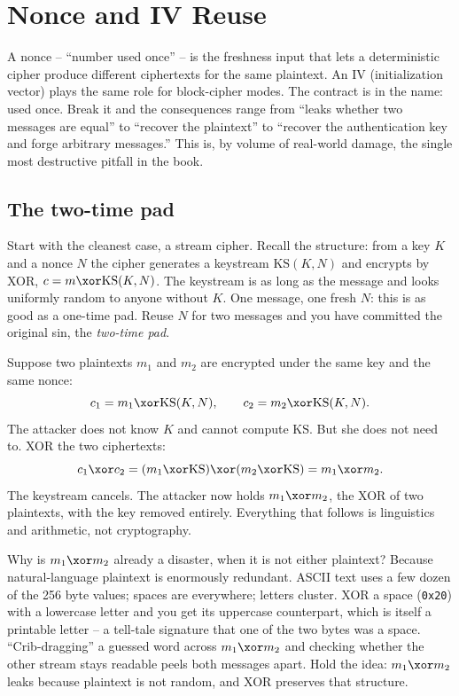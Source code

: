 \section{Nonce and IV Reuse}
\label{ch38:nonce-reuse}

A nonce -- ``number used once'' -- is the freshness input that lets a deterministic cipher produce different ciphertexts for the same plaintext. An IV (initialization vector) plays the same role for block-cipher modes. The contract is in the name: used once. Break it and the consequences range from ``leaks whether two messages are equal'' to ``recover the plaintext'' to ``recover the authentication key and forge arbitrary messages.'' This is, by volume of real-world damage, the single most destructive pitfall in the book.

\subsection{The two-time pad}
\label{ch38:two-time-pad}

Start with the cleanest case, a stream cipher. Recall the structure: from a key $K$ and a nonce $N$ the cipher generates a keystream $\mathrm{KS}(K,N)$ and encrypts by XOR, $c = m \xor \mathrm{KS}(K,N)$. The keystream is as long as the message and looks uniformly random to anyone without $K$. One message, one fresh $N$: this is as good as a one-time pad. Reuse $N$ for two messages and you have committed the original sin, the \emph{two-time pad}.

Suppose two plaintexts $m_1$ and $m_2$ are encrypted under the same key and the same nonce:
\[
c_1 = m_1 \xor \mathrm{KS}(K,N), \qquad c_2 = m_2 \xor \mathrm{KS}(K,N).
\]
The attacker does not know $K$ and cannot compute $\mathrm{KS}$. But she does not need to. XOR the two ciphertexts:
\[
c_1 \xor c_2 = (m_1 \xor \mathrm{KS}) \xor (m_2 \xor \mathrm{KS}) = m_1 \xor m_2.
\]
The keystream cancels. The attacker now holds $m_1 \xor m_2$, the XOR of two plaintexts, with the key removed entirely. Everything that follows is linguistics and arithmetic, not cryptography.

\begin{walkbox}
Why is $m_1 \xor m_2$ already a disaster, when it is not either plaintext? Because natural-language plaintext is enormously redundant. ASCII text uses a few dozen of the 256 byte values; spaces are everywhere; letters cluster. XOR a space (\texttt{0x20}) with a lowercase letter and you get its uppercase counterpart, which is itself a printable letter -- a tell-tale signature that one of the two bytes was a space. ``Crib-dragging'' a guessed word across $m_1 \xor m_2$ and checking whether the other stream stays readable peels both messages apart. Hold the idea: $m_1 \xor m_2$ leaks because plaintext is not random, and XOR preserves that structure.
\end{walkbox}

